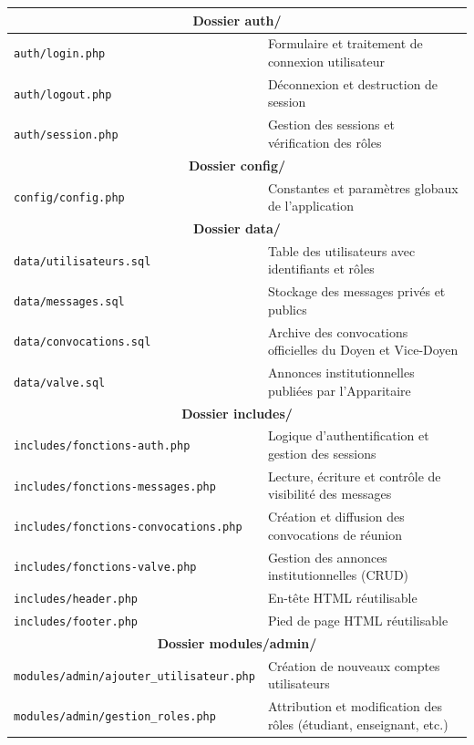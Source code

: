 \documentclass[12pt,a4paper]{article}
\begin{document}
\begin{table}[h]
\centering
\small
\begin{tabular}{|l|p{8cm}|}
\multicolumn{2}{|c|}{\textbf{Dossier auth/}} \\
\hline
\texttt{auth/login.php} & Formulaire et traitement de connexion utilisateur \\
\hline
\texttt{auth/logout.php} & Déconnexion et destruction de session \\
\hline
\texttt{auth/session.php} & Gestion des sessions et vérification des rôles \\
\hline
\multicolumn{2}{|c|}{\textbf{Dossier config/}} \\
\hline
\texttt{config/config.php} & Constantes et paramètres globaux de l’application \\
\hline
\multicolumn{2}{|c|}{\textbf{Dossier data/}} \\
\hline
\texttt{data/utilisateurs.sql} & Table des utilisateurs avec identifiants et rôles \\
\hline
\texttt{data/messages.sql} & Stockage des messages privés et publics \\
\hline
\texttt{data/convocations.sql} & Archive des convocations officielles du Doyen et Vice-Doyen \\
\hline
\texttt{data/valve.sql} & Annonces institutionnelles publiées par l’Apparitaire \\
\hline
\multicolumn{2}{|c|}{\textbf{Dossier includes/}} \\
\hline
\texttt{includes/fonctions-auth.php} & Logique d’authentification et gestion des sessions \\
\hline
\texttt{includes/fonctions-messages.php} & Lecture, écriture et contrôle de visibilité des messages \\
\hline
\texttt{includes/fonctions-convocations.php} & Création et diffusion des convocations de réunion \\
\hline
\texttt{includes/fonctions-valve.php} & Gestion des annonces institutionnelles (CRUD) \\
\hline
\texttt{includes/header.php} & En-tête HTML réutilisable \\
\hline
\texttt{includes/footer.php} & Pied de page HTML réutilisable \\
\hline
\multicolumn{2}{|c|}{\textbf{Dossier modules/admin/}} \\
\hline
\texttt{modules/admin/ajouter\_utilisateur.php} & Création de nouveaux comptes utilisateurs \\
\hline
\texttt{modules/admin/gestion\_roles.php} & Attribution et modification des rôles (étudiant, enseignant, etc.) \\

\end{tabular}
\end{table}
\end{document}
